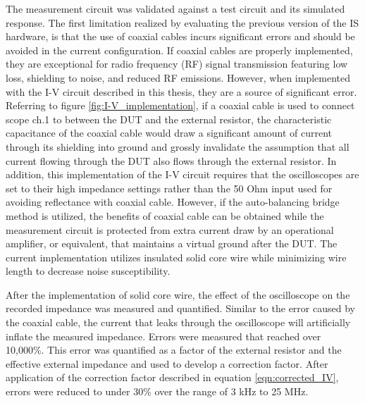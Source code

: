 \par The measurement circuit was validated against a test circuit and its simulated response. The first limitation realized by evaluating the previous version of the IS hardware, is that the use of coaxial cables incurs significant errors and should be avoided in the current configuration. If coaxial cables are properly implemented, they are exceptional for radio frequency (RF) signal transmission featuring low loss, shielding to noise, and reduced RF emissions. However, when implemented with the I-V circuit described in this thesis, they are a source of significant error. Referring to figure \ref{fig:I-V_implementation}, if a coaxial cable is used to connect scope ch.1 to between the DUT and the external resistor, the characteristic capacitance of the coaxial cable would draw a significant amount of current through its shielding into ground and grossly invalidate the assumption that all current flowing through the DUT also flows through the external resistor. In addition, this implementation of the I-V circuit requires that the oscilloscopes are set to their high impedance settings rather than the 50 Ohm input used for avoiding reflectance with coaxial cable. However, if the auto-balancing bridge method is utilized, the benefits of coaxial cable can be obtained while the measurement circuit is protected from extra current draw by an operational amplifier, or equivalent, that maintains a virtual ground after the DUT. The current implementation utilizes insulated solid core wire while minimizing wire length to decrease noise susceptibility. 

\par After the implementation of solid core wire, the effect of the oscilloscope on the recorded impedance was measured and quantified. Similar to the error caused by the coaxial cable, the current that leaks through the oscilloscope will artificially inflate the measured impedance. Errors were measured that reached over 10,000\%. This error was quantified as a factor of the external resistor and the effective external impedance and used to develop a correction factor. After application of the correction factor described in equation \ref{eqn:corrected_IV}, errors were reduced to under 30\% over the range of 3 kHz to 25 MHz. 




